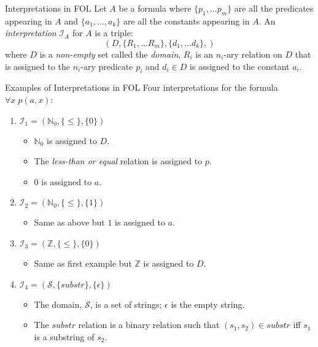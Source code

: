 \documentclass[style=sailor,size=12pt,mode=present]{powerdot}
\theoremstyle{definition}
\newenvironment{defn}[1]
  {\renewcommand\theinnerdefn{#1}\innerdefn}
  {\endinnerdefn}
\newenvironment{ex}[1]
  {\renewcommand\theinnerexample{#1}\innerexample}
  {\endinnerexample}
\newcommand{\bb}[1]{\mathbb{#1}}
\newcommand{\Z}{\bb{Z}}
\newcommand{\N}{\bb{N}}
\begin{document}
\begin{wideslide}[bm=,toc=]{Interpretations in FOL}
\begin{defn}{7.16}
Let $A$ be a formula where $\{p_1,...p_m\}$ are all the predicates
appearing in $A$ and $\{a_1,...,a_k\}$ are all the constants appearing in $A$.
An \emph{interpretation} $\mathcal{I}_A$ for $A$ is a triple:
\[(D,\{R_1,...R_m\}, \{d_1,...d_k\},)\]
where $D$ is a \emph{non-empty} set called the \emph{domain}, $R_i$ is an
$n_i$-ary relation on $D$ that is assigned to the $n_i$-ary predicate
$p_i$ and $d_i \in D$ is assigned to the constant $a_i$.
\end{defn}
\end{wideslide}
\begin{wideslide}[bm=,toc=]{Examples of Interpretations in FOL}
\begin{ex}{7.17}
Four interpretations for the formula $\forall x \; p(a,x)$:
\end{ex}
\vspace*{-2ex}
\begin{enumerate}
\item<2-> $\mathcal{I}_1 = (\N_0,\{\leq\},\{0\})$
\begin{itemize}
\item<3-> $\N_0$ is assigned to $D$.
\item<3-> The \emph{less-than or equal} relation is assigned to $p$.
\item<3-> $0$ is assigned to $a$.
\end{itemize}
\item<4-> $\mathcal{I}_2 = (\N_0,\{\leq\},\{1\})$
\begin{itemize}
\item<5-> Same as above but $1$ is assigned to $a$. 
\end{itemize}
\item<6-> $\mathcal{I}_3 = (\Z,\{\leq\},\{0\})$
\begin{itemize}
\item<7-> Same as first example but $\Z$ is assigned to $D$. 
\end{itemize}
\item<8-> $\mathcal{I}_4 = (\mathcal{S},\{substr\},\{ \epsilon \})$
\begin{itemize}
\item The domain, $\mathcal{S}$, is a set of strings; $\epsilon$ is the empty string.
\item The $substr$ relation is a binary relation such that $(s_1,s_2) \in substr$
iff $s_1$ is a substring of $s_2$.
\end{itemize}

\end{enumerate}
\end{wideslide}
\end{document}
